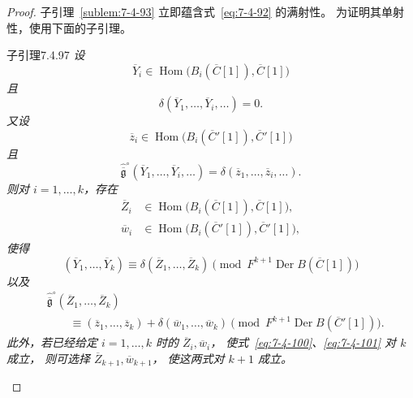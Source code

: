 \begin{proof}
子引理~\ref{sublem:7-4-93}
立即蕴含式~\eqref{eq:7-4-92} 的满射性。
为证明其单射性，使用下面的子引理。

\begin{statement}{子引理}{7.4.97}\label{sublem:7-4-97}\itshape
设
\[
\overline Y_i\in
\operatorname{Hom}\bigl(
B_i(\overline C[1]),
\overline C[1]
\bigr)
\]
且
\begin{equation}
\delta(\overline Y_1,\ldots,\overline Y_i,\ldots)=0.
\tag{7.4.98}\label{eq:7-4-98}
\end{equation}
又设
\[
\overline z_i\in
\operatorname{Hom}\bigl(
B_i(\overline C'[1]),
\overline C'[1]
\bigr)
\]
且
\begin{equation}
\widehat{\overline{\mathfrak g}}^{\circ}
(\overline Y_1,\ldots,\overline Y_i,\ldots)
=
\delta(\overline z_1,\ldots,\overline z_i,\ldots).
\tag{7.4.99}\label{eq:7-4-99}
\end{equation}
则对 $i=1,\ldots,k$，存在
\[
\begin{aligned}
\overline Z_i&\in
\operatorname{Hom}\bigl(
B_i(\overline C[1]),
\overline C[1]
\bigr),\\
\overline w_i&\in
\operatorname{Hom}\bigl(
B_i(\overline C'[1]),
\overline C'[1]
\bigr),
\end{aligned}
\]
使得
\begin{equation}
(\overline Y_1,\ldots,\overline Y_k)
\equiv
\delta(\overline Z_1,\ldots,\overline Z_k)
\pmod{F^{k+1}\operatorname{Der}B(\overline C[1])}
\tag{7.4.100}\label{eq:7-4-100}
\end{equation}
以及
\begin{equation}
\begin{aligned}
&\widehat{\overline{\mathfrak g}}^{\circ}
(\overline Z_1,\ldots,\overline Z_k)\\
&\qquad\equiv
(\overline z_1,\ldots,\overline z_k)
+\delta(\overline w_1,\ldots,\overline w_k)
\pmod{F^{k+1}\operatorname{Der}B(\overline C'[1])}.
\end{aligned}
\tag{7.4.101}\label{eq:7-4-101}
\end{equation}
此外，若已经给定
$i=1,\ldots,k$ 时的
$\overline Z_i,\overline w_i$，
使式~\eqref{eq:7-4-100}、\eqref{eq:7-4-101}
对 $k$ 成立，
则可选择
$\overline Z_{k+1},\overline w_{k+1}$，
使这两式对 $k+1$ 成立。
\end{statement}


\end{proof}
